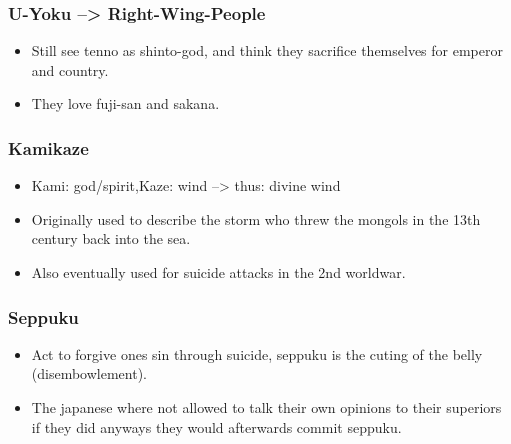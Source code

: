 \documentclass{article}
\newcommand\tabni[1][0.2cm]{\hspace*{#1}}
\begin{document}
\subsubsection{ \tabni U-Yoku --> Right-Wing-People}
\begin{itemize}
\item Still see tenno as shinto-god, and think they sacrifice themselves for emperor and country.
\item They love fuji-san and sakana. \\
\end{itemize}
\subsubsection{ \tabni Kamikaze}
\begin{itemize}
\item Kami: god/spirit,\tabni Kaze: wind --> thus: divine wind
\item Originally used to describe the storm who threw the mongols in the 13th century back into the sea. \item Also eventually used for suicide attacks in the 2nd worldwar. \\
\end{itemize}
\subsubsection{ \tabni Seppuku}
\begin{itemize}
\item Act to forgive ones sin through suicide, seppuku is the cuting of the belly (disembowlement).
\item The japanese where not allowed to talk their own opinions to their superiors if they did anyways they would afterwards commit seppuku.
\end{itemize}
\end{document}
